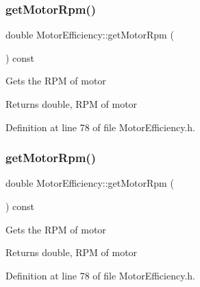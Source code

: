 \subsubsection{\texorpdfstring{get\+Motor\+Rpm()}{getMotorRpm()}\hspace{0.1cm}{\footnotesize\ttfamily [2/3]}}
{\footnotesize\ttfamily double Motor\+Efficiency\+::get\+Motor\+Rpm (\begin{DoxyParamCaption}{ }\end{DoxyParamCaption}) const\hspace{0.3cm}{\ttfamily [inline]}}

Gets the R\+PM of motor

\begin{DoxyReturn}{Returns}
double, R\+PM of motor 
\end{DoxyReturn}


Definition at line 78 of file Motor\+Efficiency.\+h.

\mbox{\label{class_motor_efficiency_ab29655f487e90a73246be6e9bc67c36a}} 
\subsubsection{\texorpdfstring{get\+Motor\+Rpm()}{getMotorRpm()}\hspace{0.1cm}{\footnotesize\ttfamily [3/3]}}
{\footnotesize\ttfamily double Motor\+Efficiency\+::get\+Motor\+Rpm (\begin{DoxyParamCaption}{ }\end{DoxyParamCaption}) const\hspace{0.3cm}{\ttfamily [inline]}}

Gets the R\+PM of motor

\begin{DoxyReturn}{Returns}
double, R\+PM of motor 
\end{DoxyReturn}


Definition at line 78 of file Motor\+Efficiency.\+h.

\mbox{\label{class_motor_efficiency_a7a5ad8d01fdc0a3bf93d952752487496}} 
